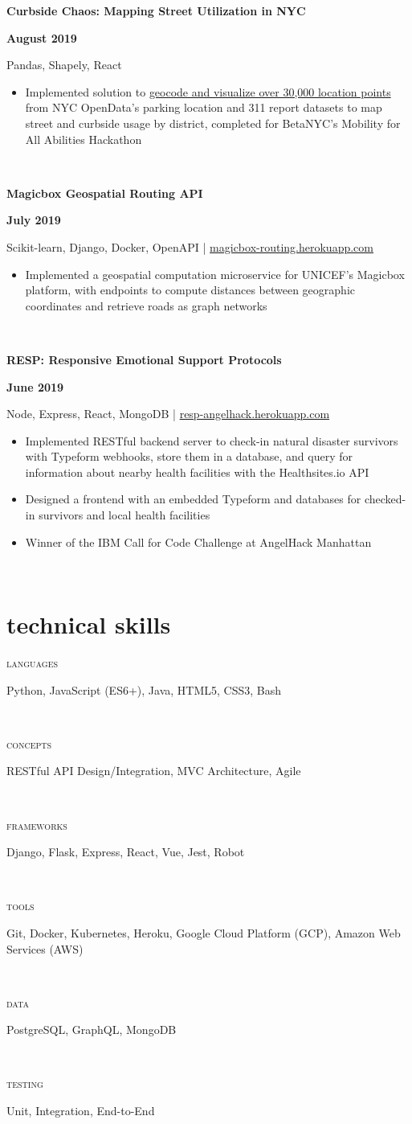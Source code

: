 \documentclass[letterpaper, 10.5pt]{article}
\newcommand{\projectentry}[4]{

    \begin{minipage}[b]{0.5\textwidth}
        \raggedright
        \bf #2
        \end{minipage}%
        \begin{minipage}[b]{0.5\textwidth}
        \raggedleft
        \bf #1
        \end{minipage}

    \begin{minipage}[t]{\linewidth}
    \vspace{-3mm}
    \small #3
    \vspace{-1.75mm}
    \small{#4}
    \end{minipage}\\
    \vspace{1mm}
    }
\newcommand{\skillentry}[2]{
    \begin{minipage}[t]{.15\linewidth}
        \hfill \textsc{#1}
        \end{minipage}
        \hfill\vline\hfill
        \begin{minipage}[t]{.80\linewidth}
        \small{#2}
        \end{minipage}\\
    }
\begin{document}
        \projectentry{August 2019}
        {Curbside Chaos: Mapping Street Utilization in NYC}
        {Pandas, Shapely, React}
        {\begin{itemize}
            \setlength\itemsep{-0.5mm}
            \item Implemented solution to \href{https://kepler.gl/demo/map?mapUrl=https://dl.dropboxusercontent.com/s/u3st74ltz03hr4s/keplergl_9f6lhlq.json}{geocode and visualize over 30,000 location points} from NYC OpenData's parking location and 311 report datasets to map street and curbside usage by district, completed for BetaNYC's Mobility for All Abilities Hackathon
        \end{itemize}
        }

        \projectentry{July 2019}
            {Magicbox Geospatial Routing API}
            {Scikit-learn, Django, Docker, OpenAPI | \href{http://magicbox-routing.herokuapp.com}{magicbox-routing.herokuapp.com}}
            {\begin{itemize}
                \setlength\itemsep{-0.5mm}
                \item Implemented a geospatial computation microservice for UNICEF's Magicbox platform, with endpoints to compute distances between geographic coordinates and retrieve roads as graph networks 
            \end{itemize}
            }

        \projectentry{June 2019}
            {RESP: Responsive Emotional Support Protocols}
            {Node, Express, React, MongoDB | \href{http://resp-angelhack.herokuapp.com}{resp-angelhack.herokuapp.com}}
            {\begin{itemize}
                \setlength\itemsep{-0.5mm}
                \item Implemented RESTful backend server to check-in natural disaster survivors with Typeform webhooks, store them in a database, and query for information about nearby health facilities with the Healthsites.io API
                \item Designed a frontend with an embedded Typeform and databases for checked-in survivors and local health facilities
                \item Winner of the IBM Call for Code Challenge at AngelHack Manhattan
            \end{itemize}
            }
            
    \section{technical skills}

    \skillentry{languages}{Python, JavaScript (ES6+), Java, HTML5, CSS3, Bash}
    \skillentry{concepts}{RESTful API Design/Integration, MVC Architecture, Agile}
    \skillentry{frameworks}{Django, Flask, Express, React, Vue, Jest, Robot}
    \skillentry{tools}{Git, Docker, Kubernetes, Heroku, Google Cloud Platform (GCP), Amazon Web Services (AWS) }
    \skillentry{data}{PostgreSQL, GraphQL, MongoDB}
    \skillentry{testing}{Unit, Integration, End-to-End}
\end{document}
